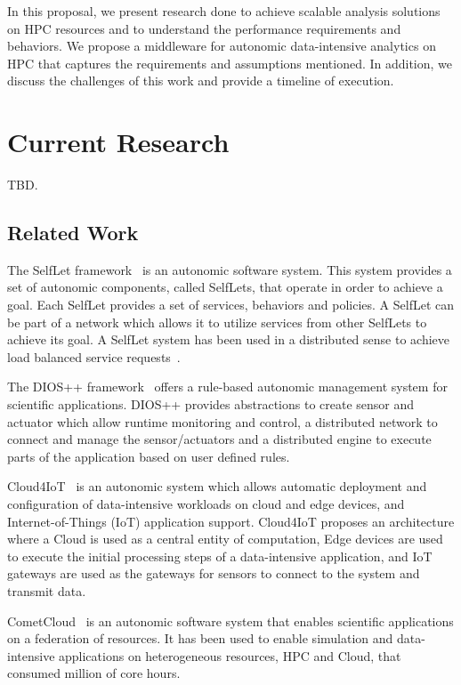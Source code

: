 In this proposal, we present research done to achieve scalable analysis solutions 
on HPC resources and to understand the performance requirements and behaviors. We 
propose a middleware for autonomic data-intensive analytics on HPC that captures 
the requirements and assumptions mentioned. In addition, we discuss the challenges 
of this work and provide a timeline of execution.

\section{Current Research}

TBD.

\subsection{Related Work}

The SelfLet framework~\cite{bindelli2008building} is an autonomic software system. 
This system provides a set of autonomic components, called SelfLets, that operate 
in order to achieve a goal. Each SelfLet provides a set of services, behaviors 
and policies. A SelfLet can be part of a network which allows it to utilize 
services from other SelfLets to achieve its goal. A SelfLet system has been used 
in a distributed sense to achieve load balanced service requests~\cite{calcavecchia2010emergence}.

The DIOS++ framework~\cite{liu2003dios} offers a rule-based autonomic management 
system for scientific applications. DIOS++ provides abstractions to create sensor 
and actuator which allow runtime monitoring and control, a distributed network to 
connect and manage the sensor/actuators and a distributed engine to execute parts 
of the application based on user defined rules.

Cloud4IoT~\cite{pizzolli2016cloud4iot} is an autonomic system which allows automatic 
deployment and configuration of data-intensive workloads on cloud and edge devices, 
and Internet-of-Things (IoT) application support. Cloud4IoT proposes an architecture 
where a Cloud is used as a central entity of computation, Edge devices are used to 
execute the initial processing steps of a data-intensive application, and IoT 
gateways are used as the gateways for sensors to connect to the system and 
transmit data.

CometCloud~\cite{diazmontes2015cometcloud} is an autonomic software system that 
enables scientific applications on a federation of resources. It has been used 
to enable simulation and data-intensive applications on heterogeneous resources, 
HPC and Cloud, that consumed million of core hours.

